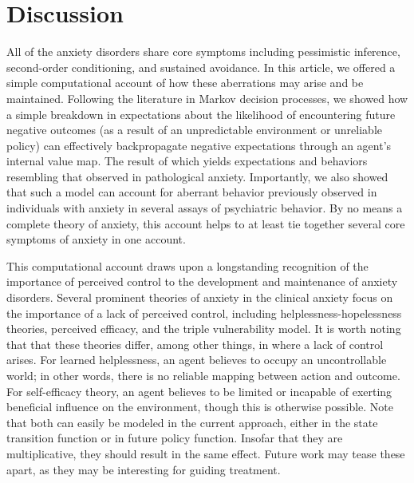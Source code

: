 \documentclass[11pt]{article} %
\begin{document}
\section{Discussion}

All of the anxiety disorders share core symptoms including pessimistic inference,
second-order conditioning, and sustained avoidance. In this article, we offered
a simple computational account of how these aberrations may arise and be maintained.
Following the literature in Markov decision processes, we showed how a simple
breakdown in expectations about the likelihood of encountering future negative
outcomes (as a result of an unpredictable environment or unreliable policy) can
effectively backpropagate negative expectations through an agent's internal value
map. The result of which yields expectations and behaviors resembling that observed
in pathological anxiety. Importantly, we also showed that such a model can account
for aberrant behavior previously observed in individuals with anxiety in several
assays of psychiatric behavior. By no means a complete theory of anxiety, this
account helps to at least tie together several core symptoms of anxiety in one
account.

This computational account draws upon a longstanding recognition of the importance
of perceived control to the development and maintenance of anxiety disorders. Several
prominent theories of anxiety in the clinical anxiety focus on the importance of
a lack of perceived control, including helplessness-hopelessness theories, perceived
efficacy, and the triple vulnerability model. It is worth noting that that these
theories differ, among other things, in where a lack of control arises. For learned
helplessness, an agent believes to occupy an uncontrollable world; in other words,
there is no reliable mapping between action and outcome. For self-efficacy theory,
an agent believes to be limited or incapable of exerting beneficial influence on
the environment, though this is otherwise possible. Note that both can easily be
modeled in the current approach, either in the state transition function or in
future policy function. Insofar that they are multiplicative, they should result
in the same effect. Future work may tease these apart, as they may be interesting
for guiding treatment.
\end{document}
